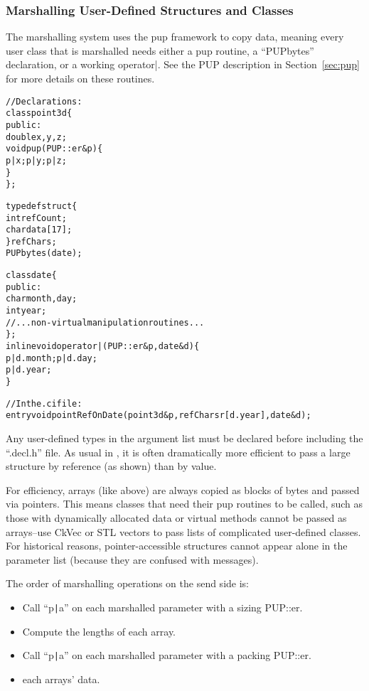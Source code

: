 \subsubsection{Marshalling User-Defined Structures and Classes}

The marshalling system uses the pup framework to copy data,
meaning every user class that is marshalled needs either a
pup routine, a ``PUPbytes'' declaration, or a working operator|.
See the PUP description in Section~\ref{sec:pup} for more details 
on these routines.

\begin{alltt}
//Declarations:
class point3d \{
public:
    double x,y,z;    
    void pup(PUP::er &p) \{
      p|x; p|y; p|z;
    \}
\};

typedef struct \{
    int refCount;
    char data[17];
\} refChars;
PUPbytes(date);

class date \{
public:
    char month,day;
    int year;
    //...non-virtual manipulation routines...
\};
inline void operator|(PUP::er &p,date &d) \{
    p|d.month; p|d.day;
    p|d.year;
\}

//In the .ci file:
    entry void pointRefOnDate(point3d &p,refChars r[d.year],date &d);
\end{alltt}

Any user-defined types in the argument list must be declared 
before including the ``.decl.h'' file.
As usual in \CC, it is often dramatically more efficient to pass
a large structure by reference (as shown) than by value.

For efficiency, arrays (like  above) are always copied
as blocks of bytes and passed via pointers.  This means classes
that need their pup routines to be called, such as those with dynamically
allocated data or virtual methods cannot be passed as arrays--use CkVec
or STL vectors to pass lists of complicated user-defined classes. 
For historical reasons, pointer-accessible structures 
cannot appear alone in the parameter list (because they are confused 
with messages).

The order of marshalling operations on the send side is:
\begin{itemize}
\item Call ``p\verb.|.a'' on each marshalled parameter with a sizing PUP::er.
\item Compute the lengths of each array.
\item Call ``p\verb.|.a'' on each marshalled parameter with a packing PUP::er.
\item {} each arrays' data.
\end{itemize}

